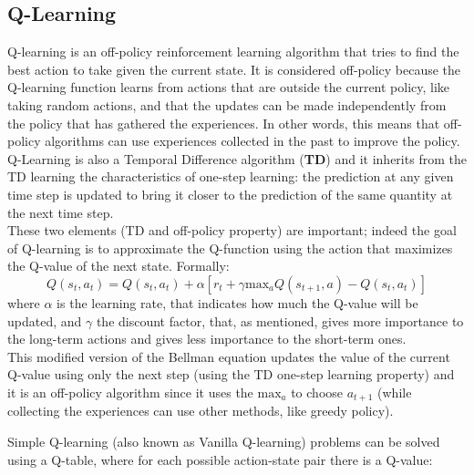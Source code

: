 \documentclass[14pt]{extarticle}
\def\sp{\vspace{5pt}}
\def\ppn{\vspace{10pt}}
\begin{document}
\begin{flushleft}
\subsection{Q-Learning}
\sp
Q-learning is an off-policy reinforcement learning algorithm that tries to find the best action to take given the current state. It is considered off-policy because the Q-learning function learns from actions that are outside the current policy, like taking random actions, and that the updates can be made independently from the policy that has gathered the experiences. In other words, this means that off-policy algorithms can use experiences collected in the past to improve the policy.\\
Q-Learning is also a Temporal Difference algorithm (\textbf{TD}\cite{TDl}) and it inherits from the TD learning the characteristics of one-step learning: the prediction at any given time step is updated to bring it closer to the prediction of the same quantity at the next time step.\\
These two elements (TD and off-policy property) are important; indeed the goal of Q-learning is to approximate the Q-function using the action that maximizes the Q-value of the next state. Formally:
\begin{equation} \label{eq:2}
 Q(s_t,a_t) = Q(s_t,a_t) + 
\alpha[r_t + \gamma \text{max}_{a}Q(s_{t+1},a) - Q(s_t,a_t)] 
\end{equation}
where $\alpha$ is the learning rate, that indicates how much the Q-value will be updated, and $\gamma$ the discount factor, that, as mentioned, gives more importance to the long-term actions and gives less importance to the short-term ones. \\
This modified version of the Bellman equation updates the value of the current Q-value using only the next step (using the TD one-step learning property) and it is an off-policy 
algorithm since it uses the $\text{max}_{a}$ to choose $a_{t+1}$ (while collecting the experiences can use other methods, like greedy policy).

\ppn
Simple Q-learning (also known as Vanilla Q-learning) problems can be solved using a Q-table, where for each possible  action-state pair there is a Q-value:


\end{flushleft}
\end{document}
